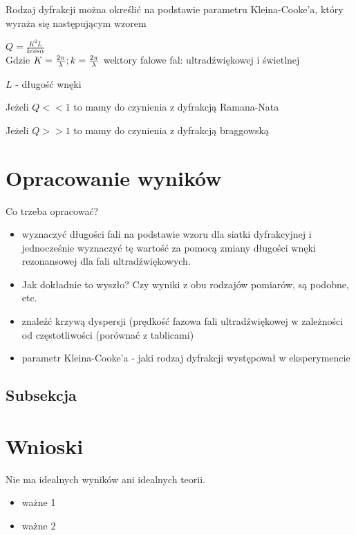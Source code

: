 \documentclass[a4paper,11pt]{article}
\begin{document}
Rodzaj dyfrakcji można określić na podstawie parametru Kleina-Cooke'a, który wyraża się następującym wzorem

\(
Q = \frac{K^2  L}{k cos \alpha }
\)
\\
Gdzie
\(
K = \frac{2 \pi}{ \lambda }; \\ k = \frac{2 \pi}{\lambda}
\) wektory falowe fal: ultradźwiękowej i świetlnej

\( L  \) - długość wnęki

Jeżeli \( Q << 1\) to mamy do czynienia z dyfrakcją Ramana-Nata

Jeżeli \( Q >> 1 \) to mamy do czynienia z dyfrakcją braggowską

\section{Opracowanie wyników}
Co trzeba opracować?
\begin{itemize}
\item wyznaczyć długości fali na podstawie wzoru dla siatki dyfrakcyjnej i jednocześnie wyznaczyć tę wartość za pomocą zmiany długości wnęki rezonansowej dla fali ultradźwiękowych.

\item Jak dokładnie to wyszło? Czy wyniki z obu rodzajów pomiarów, są podobne, etc.

\item znaleźć krzywą dyspersji (prędkość fazowa fali ultradźwiękowej w zależności od częstotliwości (porównać z tablicami)

\item parametr Kleina-Cooke'a - jaki rodzaj dyfrakcji występował w eksperymencie
\end{itemize}


\subsection{Subsekcja}


\section{Wnioski}

Nie ma idealnych wyników ani idealnych teorii.

\begin{itemize}
  \item ważne 1
  \item ważne 2
  
\end{itemize}
\end{document}
